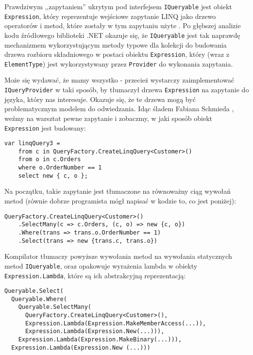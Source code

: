 Prawdziwym ,,zapytaniem'' ukrytym pod interfejsem \texttt{IQueryable} jest obiekt \texttt{Expression}, który reprezentuje wejściowe zapytanie LINQ jako drzewo operatorów i metod, które zostały w tym zapytaniu użyte \cite{linq_queryable}. Po głębszej analizie kodu źródłowego biblioteki .NET okazuje się, że \texttt{IQueryable} jest tak naprawdę mechanizmem wykorzystującym metody typowe dla kolekcji do budowania drzewa rozbioru składniowego w postaci obiektu \texttt{Expression}, który (wraz z \texttt{ElementType}) jest wykorzystywany przez \texttt{Provider} do wykonania zapytania.

Może się wydawać, że mamy wszystko - przecież wystarczy zaimplementować \linebreak \texttt{IQueryProvider} w taki sposób, by tłumaczył drzewa \texttt{Expression} na zapytanie do języka, który nas interesuje. Okazuje się, że te drzewa mogą być problematycznym modelem do odwiedzania. Idąc śladem Fabiana Schmieda \cite{re-linq}, weźmy na warsztat pewne zapytanie i zobaczmy, w jaki sposób obiekt \texttt{Expression} jest budowany:

\begin{lstlisting}
var linqQuery3 = 
    from c in QueryFactory.CreateLinqQuery<Customer>()
    from o in c.Orders
    where o.OrderNumber == 1
    select new { c, o };
\end{lstlisting}

Na początku, takie zapytanie jest tłumaczone na równoważny ciąg wywołań metod (równie dobrze programista mógł napisać w kodzie to, co jest poniżej):

\begin{lstlisting}
QueryFactory.CreateLinqQuery<Customer>()
    .SelectMany(c => c.Orders, (c, o) => new {c, o})
    .Where(trans => trans.o.OrderNumber == 1)
    .Select(trans => new {trans.c, trans.o})
\end{lstlisting}

Kompilator tłumaczy powyższe wywołania metod na wywołania statycznych metod \texttt{IQueryable}, oraz opakowuje wyrażenia lambda w obiekty \linebreak \texttt{Expression.Lambda}, które są ich abstrakcyjną reprezentacją:

\begin{lstlisting}
Queryable.Select(
  Queryable.Where(
    Queryable.SelectMany(
      QueryFactory.CreateLinqQuery<Customer>(),
      Expression.Lambda(Expression.MakeMemberAccess(...)),
      Expression.Lambda(Expression.New(...))),
    Expression.Lambda(Expression.MakeBinary(...))),
  Expression.Lambda(Expression.New (...)))
\end{lstlisting}


